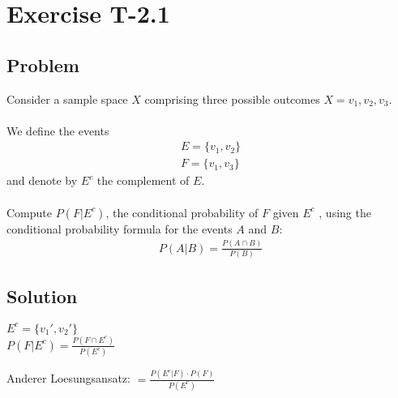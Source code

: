 \section*{Exercise T-2.1}

\subsection*{Problem}
Consider a sample space $X$ comprising three possible outcomes $X = {v_1, v_2, v_3}$.\\ \\
We define the events
\begin{align}
	E = \{v_1,v_2\} \nonumber \\
	F = \{v_1,v_3\}\nonumber 
\end{align}
and denote by $E^c$ the complement of $E$.\\ \\
Compute $P(F|E^c)$, the conditional probability of $F$ given $E^c$ , using the conditional
probability formula for the events $A$ and $B$:\\

\begin{align}
P(A|B)=  \frac{P(A \cap B)}{P(B)} \nonumber 
\end{align}


\subsection*{Solution}
$E^c = \{v_1', v_2'\}$
\\
$P(F|E^c) = \frac{P(F\cap E^c)}{P(E^c)}$

Anderer Loesungsansatz:
$ = \frac{P(E^c|F)\cdot P(F)}{P(E^c)}$
